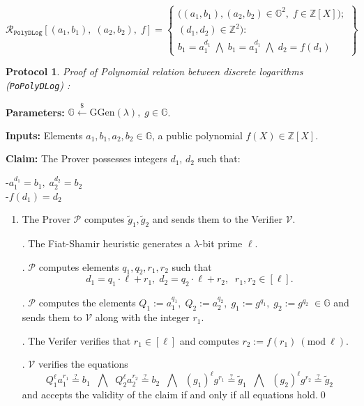 \documentclass[11pt, lettersize, notitlepage, leqno, footskip=0.6cm]{article}
\newcommand{\bz}{\mathbb Z}
\newcommand{\ttt}{\texttt}
\newcommand{\wti}{\widetilde}
\newcommand{\mc}{\mathcal}
\newcommand{\mb}{\mathbb}
\newcommand{\mr}{\mathrm}
\newcommand{\lamb}{\lambda}
\newcommand{\vs}{\vspace{-0.15cm}}
\newcommand{\Mod}[1]{\ (\mathrm{mod}\ #1)}
\newtheorem{Prot}[Thm]{Protocol}
\numberwithin{equation}{section}
\begin{document}
\[
  \mc{R}_{{\ttt{PolyDLog}}}[(a_1, b_1),\;(a_2,b_2),\;f] = \left\{\begin{array}{l}
    \big((a_1, b_1), (a_2,b_2)\in\mb{G}^2,\;f\in\bz[X]\big);\\
    (d_1, d_2)\in\mb{Z}^2): \\
    b_1 = a_1^{d_1}\; \bigwedge\; b_1 = a_1^{d_1}\; \bigwedge \;d_2 = f(d_1)
  \end{array}\right\}
\] 

\vspace{0.1cm}


\begin{Prot} \normalfont \textit{Proof of Polynomial relation between discrete logarithms} (\verb|PoPolyDLog|) :\end{Prot} \vspace{-0.3cm}

\noindent \textbf{Parameters:} $\mb{G}\xleftarrow{\$} \mr{GGen}(\lamb), \; g\in \mb{G}$.

\noindent \textbf{Inputs:} Elements $a_1, b_1, a_2, b_2\in \mb{G}$, a public polynomial $f(X)\in\bz[X]$.

\noindent \textbf{Claim:} The Prover possesses integers $d_1$, $d_2$ such that:

\noindent -$a_1^{d_1} = b_1,\;  a_2^{d_2} = b_2$\\
-$f(d_1) = d_2$

\begin{enumerate}[wide, labelwidth=!, labelindent=0pt]\vs \item The Prover $\mc{P}$ computes $\wti{g}_1, \wti{g}_2$ and sends them to the Verifier $\mc{V}$.

. The Fiat-Shamir heuristic generates a $\lamb$-bit prime $\ell$.

. $\mc{P}$ computes elements $q_1, q_2, r_1, r_2$ such that \vs $$d_1 = q_1\cdot\ell+r_1,\; d_2 = q_2\cdot\ell+r_2,\;\; r_1,r_2\in [\ell].$$

. $\mc{P}$ computes the elements $Q_1:= a_1^{q_1},\;Q_2:= a_2^{q_2},\; g_1:= g^{q_1},\; g_2:= g^{q_2}\;\in\mb{G}$ and sends them to $\mc{V}$ along with the integer $r_1$.

. The Verifer verifies that $r_1\in [\ell]$ and computes $r_2:= f(r_1)\Mod{\ell}$.

. $\mc{V}$ verifies the equations \vs $$Q_1^{\ell}a_1^{r_1}\stackrel{?}{=} b_1\;\;\bigwedge\;\; Q_2^{\ell}a_2^{r_2}\stackrel{?}{=} b_2 \;\;\bigwedge\;\; (g_1)^{\ell}g^{r_1} \stackrel{?}{=} \wti{g}_1\;\;\bigwedge\;\; (g_2)^{\ell}g^{r_2} \stackrel{?}{=} \wti{g}_2 $$ and accepts the validity of the claim if and only if all equations hold.\qed \end{enumerate}
\end{document}

